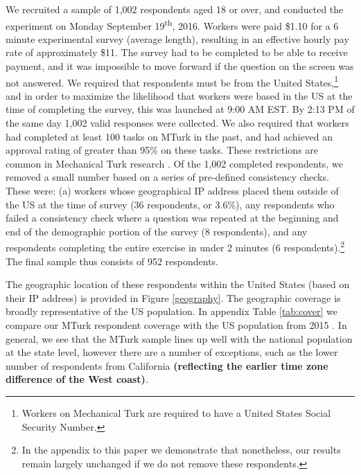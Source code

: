 \documentclass[a4paper, 11pt]{article}
\begin{document}
\begin{spacing}{1.4}
We recruited a sample of 1,002 respondents aged 18 or over, and conducted
the experiment on Monday September 19\textsuperscript{th}, 2016.  Workers
were paid \$1.10 for a 6 minute experimental survey (average length), resulting in
an effective hourly pay rate of approximately \$11. The survey had to be completed to be
able to receive payment, and it was impossible to move forward if the question on the screen was not answered.
We required that respondents must be from the United States,\footnote{Workers on Mechanical
  Turk are required to have a United States Social Security Number.} and in order to
maximize the likelihood that workers were based in the US at the time of
completing the survey, this was launched at 9:00 AM EST.  By 2:13 PM
of the same day 1,002 valid responses were collected.  We also required
that workers had completed at least 100 tasks on MTurk in the past, and
had achieved an approval rating of greater than 95\% on these tasks.
These restrictions are common in Mechanical Turk research
\citep{Berinskyetal2012,Francis-TanMialon2015}.  Of the 1,002 completed
respondents, we removed a small number based on a series of pre-defined
consistency checks.  These were: (a) workers whose geographical IP address
placed them outside of the US at the time of survey (36 respondents, or
3.6\%), any respondents who failed a consistency check where a question was
repeated at the beginning and end of the demographic portion of the survey
(8 respondents), and any respondents completing the entire exercise in
under 2 minutes (6 respondents).\footnote{In the appendix to this paper we
  demonstrate that nonetheless, our results remain largely unchanged if we
  do not remove these respondents.}  The final sample thus consists of 952
respondents.

The geographic location of these respondents within the United States (based
on their IP address) is provided in Figure \ref{geography}.  The geographic
coverage is broadly representative of the US population.  In appendix Table
\ref{tab:cover} we compare our MTurk respondent coverage with the US population
from 2015 \citep{CensusBureau2015}.  In general, we see that the MTurk sample
lines up well with the national population at the state level, however there
are a number of exceptions, such as the lower number of respondents from
California \textbf{(reflecting the earlier time zone difference of the West coast)}.  %


\end{spacing}
\end{document}

